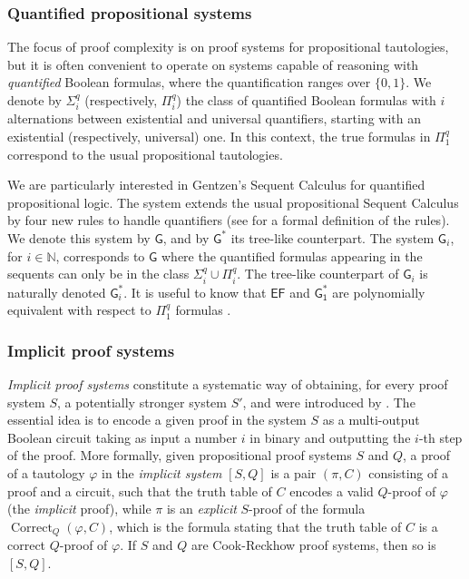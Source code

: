 \documentclass[11pt]{article}
\newcommand{\EF}{\mathsf{EF}}
\newcommand{\Gent}{\mathsf{G}}
\newcommand{\GentS}{\mathsf{G^*}}
\newcommand{\GOS}{\mathsf{G^*_1}}
\theoremstyle{definition}
\theoremstyle{plain}
\theoremstyle{remark}
\newcommand{\bbN}{\mathbb{N}}
\begin{document}
\subsubsection{Quantified propositional systems}
The focus of proof complexity is on proof systems for propositional tautologies, but it is often convenient to operate on systems capable of reasoning with \emph{quantified} Boolean formulas, where the quantification ranges over $\{0, 1\}$. We denote by $\Sigma^q_i$ (respectively, $\Pi^q_i$) the class of quantified Boolean formulas with $i$ alternations between existential and universal quantifiers, starting with an existential (respectively, universal) one. In this context, the true formulas in $\Pi_1^q$ correspond to the usual propositional tautologies.

We are particularly interested in Gentzen's Sequent Calculus for quantified propositional logic. The system extends the usual propositional Sequent Calculus by four new rules to handle quantifiers (see \cite[Def. 4.1.2]{krajicekBOOK} for a formal definition of the rules). We denote this system by $\Gent$, and by $\GentS$ its tree-like counterpart. The system $\Gent_i$, for $i\in\bbN$, corresponds to $\Gent$ where the quantified formulas appearing in the sequents can only be in the class $\Sigma_i^q \cup \Pi_i^q$. The tree-like counterpart of $\Gent_i$ is naturally denoted $\mathsf{G}^*_i$. It is useful to know that $\EF$ and $\GOS$ are polynomially equivalent with respect to $\Pi^q_1$ formulas \cite[Thm. 4.1.3]{krajicekBOOK}.

\subsubsection{Implicit proof systems}
\emph{Implicit proof systems} constitute a systematic way of obtaining, for every proof system $S$, a potentially stronger system $S'$, and were introduced by \citeauthor{Kra04} \cite{Kra04}. The essential idea is to encode a given proof in the system $S$ as a multi-output Boolean circuit taking as input a number $i$ in binary and outputting the $i$-th step of the proof. More formally, given propositional proof systems $S$ and $Q$, a proof of a tautology $\varphi$ in the \emph{implicit system} $[S, Q]$ is a pair $(\pi, C)$ consisting of a proof and a circuit, such that the truth table of $C$ encodes a valid $Q$-proof of $\varphi$ (the \emph{implicit} proof), while $\pi$ is an \emph{explicit} $S$-proof of the formula $\operatorname{Correct}_Q(\varphi, C)$, which is %
the formula stating that the truth table of $C$ is a correct $Q$-proof of $\varphi$. If $S$ and $Q$ are Cook-Reckhow proof systems, then so is $[S, Q]$.
\end{document}
